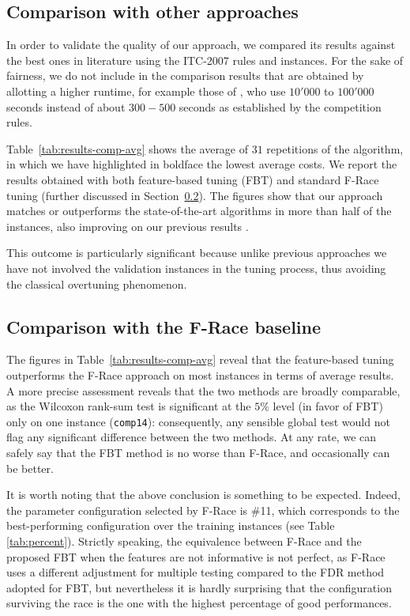 \documentclass[authoryear,12pt]{article}
\begin{document}
\subsection{Comparison with other approaches}

In order to validate the quality of our approach, we compared its results
against the best ones in literature using the ITC-2007 rules and instances.  For
the sake of fairness, we do not include in the comparison results that are
obtained by allotting a higher runtime, for example those of \cite{AsNi14}, who
use $10'000$ to $100'000$ seconds instead of about $300-500$ seconds as
established by the competition rules.

Table~\ref{tab:results-comp-avg} shows the average of $31$ repetitions of the
algorithm, in which we have highlighted in boldface the lowest average costs. We
report the results obtained with both feature-based tuning (FBT) and standard
F-Race tuning (further discussed in Section~\ref{sec:comparison-frace}). The
figures show that our approach matches or outperforms the state-of-the-art
algorithms in more than half of the instances, also improving on our previous
results \citep{BeDS12}.

This outcome is particularly significant because unlike previous approaches we
have not involved the validation instances in the tuning process, thus avoiding
the classical overtuning phenomenon.

\subsection{Comparison with the F-Race baseline}
\label{sec:comparison-frace}

The figures in Table~\ref{tab:results-comp-avg} reveal that the feature-based
tuning outperforms the F-Race approach on most instances in terms of average
results. A more precise assessment reveals that the two methods are broadly
comparable, as the Wilcoxon rank-sum test is significant at the $5\%$ level (in
favor of FBT) only on one instance (\texttt{comp14}): consequently, any sensible
global test would not flag any significant difference between the two methods.
At any rate, we can safely say that the FBT method is no worse than F-Race, and
occasionally can be better.

It is worth noting that the above conclusion is something to be expected.
Indeed, the parameter configuration selected by F-Race is \#11, which
corresponds to the best-performing configuration over the training instances
(see Table \ref{tab:percent}).  Strictly speaking, the equivalence between
F-Race and the proposed FBT when the features are not informative is not
perfect, as F-Race uses a different adjustment for multiple testing compared to
the FDR method adopted for FBT, but nevertheless it is hardly surprising that
the configuration surviving the race is the one with the highest percentage of
good performances.
\end{document}
